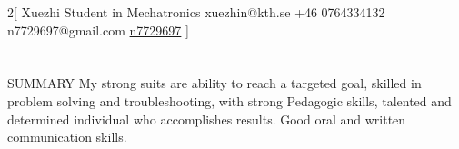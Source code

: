 \documentclass{my_cv}
\begin{document}
\begin{multicols}{2}[
        {Xuezhi}%
        {Student in Mechatronics}%
        {xuezhin@kth.se}%
        {+46 0764334132}%
        {n7729697@gmail.com}%
        {\faGithub \href{https://github.com/n7729697}{n7729697}}%
]
\end{multicols}

\section{\faFileText}{SUMMARY}
My strong suits are ability to reach a targeted goal, skilled in problem solving and troubleshooting, with strong Pedagogic skills, talented and determined individual who accomplishes results. Good oral and written communication skills.
\end{document}
